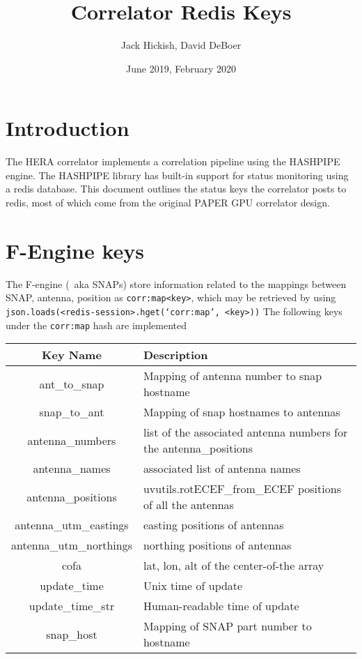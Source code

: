 \documentclass{article}
\title{Correlator Redis Keys}
\author{Jack Hickish, David DeBoer}
\date{June 2019, February 2020}
\begin{document}
\maketitle

\section{Introduction}
The HERA correlator implements a correlation pipeline using the HASHPIPE engine. The HASHPIPE library has built-in support for status monitoring using a redis database.
This document outlines the status keys the correlator posts to redis, most of which come from the original PAPER GPU correlator design.

\section{F-Engine keys}

The F-engine (~aka SNAPs) store information related to the mappings between SNAP, antenna, position as \texttt{corr:map<key>}, which may be retrieved by using \texttt{json.loads(<redis-session>.hget(`corr:map', <key>))}
The following keys under the \texttt{corr:map} hash are implemented

\begin{centering}
\begin{tabular}{c p{}}
\hline
Key Name & Description \\
\hline
\hline
ant\_to\_snap           & Mapping of antenna number to snap hostname \\
snap\_to\_ant           & Mapping of snap hostnames to antennas \\
antenna\_numbers  & list of the associated antenna numbers for the antenna\_positions \\
antenna\_names & associated list of antenna names \\
antenna\_positions                   & uvutils.rotECEF\_from\_ECEF positions of all the antennas \\
antenna\_utm\_eastings & easting positions of antennas \\
antenna\_utm\_northings & northing positions of antennas \\
cofa                          & lat, lon, alt of the center-of-the array \\
update\_time           & Unix time of update \\
update\_time\_str     & Human-readable time of update \\
snap\_host                & Mapping of SNAP part number to hostname \\
\end{tabular}
\end{centering}
\end{document}
